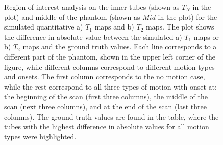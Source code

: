 \begin{figure}[ht]
    \caption{Region of interest analysis on the inner tubes (shown as $T_N$ in the plot) and middle of the phantom (shown as $Mid$ in the plot) for the simulated quantitative a) $T_1$  maps and b) $T_2$ maps.
    The plot shows the difference in absolute value between the simulated a) $T_1$ maps or b) $T_2$ maps and the ground truth values.
    Each line corresponds to a different part of the phantom, shown in the upper left corner of the figure, while different columns correspond to different motion types and onsets.
    The first column corresponds to the no motion case,
    while the rest correspond to all three types of motion with onset at:
    the beginning of the scan (first three columns),
    the middle of the scan (next three columns), and
    at the end of the scan (last three columns).
    The ground truth values are found in the table, where the tubes with the highest difference in absolute values for all motion types were highlighted.}
    \label{fig:GTMinusSimuAbsoluteDifference}
\end{figure}



\hfill


